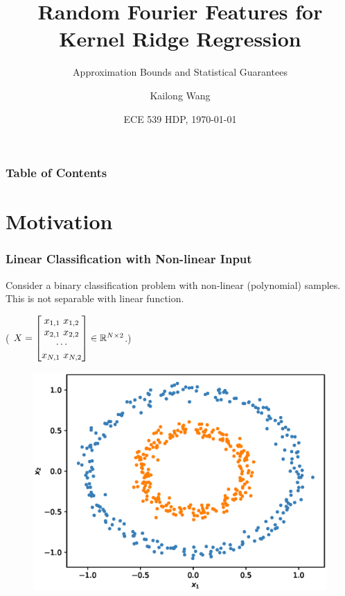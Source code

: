 \documentclass[10pt]{../formats/RU}
\title[Random Fourier Features]{Random Fourier Features for Kernel Ridge Regression}
\subtitle{Approximation Bounds and Statistical Guarantees}
\author[Kai] %
{Kailong Wang\inst{1} 
}
\institute[Rutgers] %
{
  \inst{1}%
  Ph.D.\ of ECE\\
  Rutgers University
}
\date[\today] %
{ECE 539 HDP, \today}
\begin{document}
\frame{\titlepage}
\begin{frame}
\frametitle{Table of Contents}
\tableofcontents
\end{frame}


\section{Motivation}
\begin{frame}
  \frametitle{Linear Classification with Non-linear Input}
  Consider a binary classification problem with non-linear (\eg polynomial) samples. This is not separable with linear function. 

  (\eg %
  $X = {
    \begin{bmatrix}
      x_{1,1} \ x_{1,2} \\
      x_{2,1} \ x_{2,2} \\
      \cdots \\
      x_{N,1} \ x_{N,2}
    \end{bmatrix}
  }\in \mathbb{R}^{N\times 2}$.)
  \begin{figure}
    \includegraphics[height=0.5\textheight]{./figs/2d_poly_circle.eps}%
  \end{figure}
\end{frame}
\end{document}
